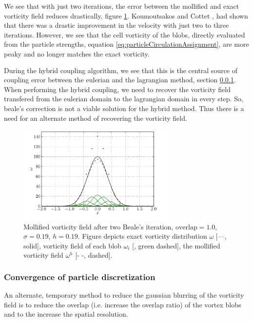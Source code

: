 We see that with just two iterations, the error between the mollified and exact vorticity field reduces drastically, figure \ref{fig:bealesCorrection}. Koumoutsakos and Cottet \cite{Cottet2000a}, had shown that there was a drastic improvement in the velocity with just two to three iterations. However, we see that the cell vorticity of the blobs, directly evaluated from the particle strengths, equation \ref{eq:particleCirculationAssignment}, are more peaky and no longer matches the exact vorticity. 

During the hybrid coupling algorithm, we see that this is the central source of coupling error between the eulerian and the lagrangian method, section \ref{}. When performing the hybrid coupling, we need to recover the vorticity field transfered from the eulerian domain to the lagrangian domain in every step. So, beale's correction is not a viable solution for the hybrid method. Thus there is a need for an alternate method of recovering the vorticity field.


	\begin{figure}[t]
	\centering
	\includegraphics[width=0.7\textwidth]{figures/lagrangian/bealesCorrection.pdf}
	\caption{Mollified vorticity field after two Beale's iteration, $\mathrm{overlap}=1.0$, $\sigma=0.19$, $h=0.19$. Figure depicts exact vorticity distribution $\omega$ [---, solid], vorticity field of each blob $\omega_i$ [{\color{darkgreen}{---}}, green dashed], the mollified vorticity field $\omega^h$ [- -, dashed].  }
	\label{fig:bealesCorrection}
	\end{figure}



\subsubsection{Convergence of particle discretization}

An alternate, temporary method to reduce the gaussian blurring of the vorticity field is to reduce the overlap (i.e. increase the overlap ratio) of the vortex blobs and to the increase the spatial resolution.
	
